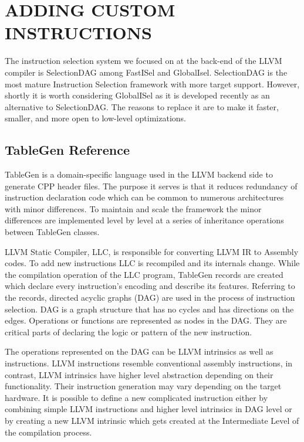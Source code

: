 \clearpage
\chapter{ADDING CUSTOM INSTRUCTIONS}\label{ch:custom_instr}
The instruction selection system we focused on at the back-end of the LLVM compiler is SelectionDAG among FastISel and GlobalIsel. SelectionDAG is the most mature Instruction Selection framework with more target support. However, shortly it is worth considering GlobalISel as it is developed recently as an alternative to SelectionDAG. The reasons to replace it are to make it faster, smaller, and more open to low-level optimizations.
\section{TableGen Reference}
TableGen is a domain-specific language used in the LLVM backend side to generate CPP header files. The purpose it serves is that it reduces redundancy of instruction declaration code which can be common to numerous architectures with minor differences. To maintain and scale the framework the minor differences are implemented level by level at a series of inheritance operations between TableGen classes. 

\par
 LLVM Static Compiler, LLC, is responsible for converting LLVM IR to Assembly codes. To add new instructions LLC is recompiled and its internals change. While the compilation operation of the LLC program, TableGen records are created which declare every instruction’s encoding and describe its features. Referring to the records, directed acyclic graphs (DAG) are used in the process of instruction selection. DAG is a graph structure that has no cycles and has directions on the edges. Operations or functions are represented as nodes in the DAG. They are critical parts of declaring the logic or pattern of the new instruction. 
\par

The operations represented on the DAG can be LLVM intrinsics as well as instructions. LLVM instructions resemble conventional assembly instructions, in contrast, LLVM intrinsics have higher level abstraction depending on their functionality. Their instruction generation may vary depending on the target hardware. It is possible to define a new complicated instruction either by combining simple LLVM instructions and higher level intrinsics in DAG level or by creating a new LLVM intrinsic which gets created at the Intermediate Level of the compilation process.

